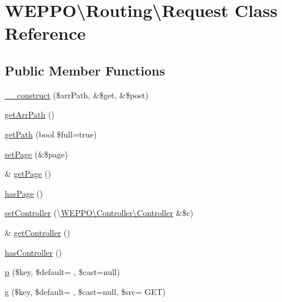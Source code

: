 \hypertarget{classWEPPO_1_1Routing_1_1Request}{}\section{W\+E\+P\+PO\textbackslash{}Routing\textbackslash{}Request Class Reference}
\label{classWEPPO_1_1Routing_1_1Request}
\subsection*{Public Member Functions}
\begin{DoxyCompactItemize}
\item 
\hyperlink{classWEPPO_1_1Routing_1_1Request_a2df7eed992d7d3dc3bfbc7fc549df298}{\+\_\+\+\_\+construct} (\$arr\+Path, \&\$get, \&\$post)
\item 
\hyperlink{classWEPPO_1_1Routing_1_1Request_aa16f46073078db9c7a15999e4ff093a1}{get\+Arr\+Path} ()
\item 
\hyperlink{classWEPPO_1_1Routing_1_1Request_a0e9d8520583026c246c980a993705dcb}{get\+Path} (bool \$full=true)
\item 
\hyperlink{classWEPPO_1_1Routing_1_1Request_a60551ee7635e757aad14d0c33e3dbe00}{set\+Page} (\&\$page)
\item 
\& \hyperlink{classWEPPO_1_1Routing_1_1Request_a5a29ab8fe1523fac28b299c62e077e56}{get\+Page} ()
\item 
\hyperlink{classWEPPO_1_1Routing_1_1Request_a7fc2d3b1980442087eb7b9934bb5f0d7}{has\+Page} ()
\item 
\hyperlink{classWEPPO_1_1Routing_1_1Request_a0a7a13a76877d17b7bf22d525ecd8d12}{set\+Controller} (\textbackslash{}\hyperlink{classWEPPO_1_1Controller_1_1Controller}{W\+E\+P\+P\+O\textbackslash{}\+Controller\textbackslash{}\+Controller} \&\$c)
\item 
\& \hyperlink{classWEPPO_1_1Routing_1_1Request_aed4bd38116569c3efe3304f4fcaad678}{get\+Controller} ()
\item 
\hyperlink{classWEPPO_1_1Routing_1_1Request_aeb70a635959c169aef04f6e38e307379}{has\+Controller} ()
\item 
\hyperlink{classWEPPO_1_1Routing_1_1Request_a383eb0298140b9b511a150b3354ccab5}{p} (\$key, \$default= \textquotesingle{}\textquotesingle{}, \$cast=null)
\item 
\hyperlink{classWEPPO_1_1Routing_1_1Request_ab3c2bb6765765ed410123f98bc21d353}{g} (\$key, \$default= \textquotesingle{}\textquotesingle{}, \$cast=null, \$src= \textquotesingle{}G\+ET\textquotesingle{})
\end{DoxyCompactItemize}

